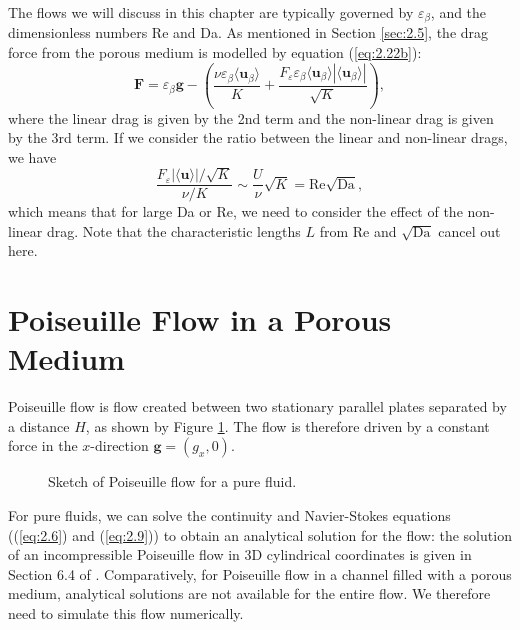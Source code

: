 \documentclass[a4paper, 11pt]{report}
\begin{document}
The flows we will discuss in this chapter are typically governed by $\varepsilon_\beta$, and the dimensionless numbers Re and Da. As mentioned in Section \ref{sec:2.5}, the drag force from the porous medium is modelled by equation (\ref{eq:2.22b}):
\begin{equation}
    \mathbf{F} = \varepsilon_\beta\mathbf{g} - \left(\frac{\nu\varepsilon_\beta\langle\mathbf{u}_\beta\rangle}{K} + \frac{F_\varepsilon\varepsilon_\beta\langle\mathbf{u}_\beta\rangle\left|\langle\mathbf{u}_\beta\rangle\right|}{\sqrt{K}}\right), \label{eq:4.3}
\end{equation}
where the linear drag is given by the 2nd term and the non-linear drag is given by the 3rd term. If we consider the ratio between the linear and non-linear drags, we have
\begin{equation}
    \frac{F_\varepsilon|\langle\mathbf{u}\rangle|/\sqrt{K}}{\nu/K} \sim \frac{U}{\nu}\sqrt{K}=\mathrm{Re}\sqrt{\mathrm{Da}}, \label{eq:4.4}
\end{equation}
which means that for large Da or Re, we need to consider the effect of the non-linear drag. Note that the characteristic lengths $L$ from Re and $\sqrt{\mathrm{Da}}$ cancel out here.

\section{Poiseuille Flow in a Porous Medium}
Poiseuille flow is flow created between two stationary parallel plates separated by a distance $H$, as shown by Figure \ref{fig:poiseuille}. The flow is therefore driven by a constant force in the $x$-direction $\mathbf{g} = (g_x, 0)$.
\begin{figure}[!htb]
\centering

\caption{Sketch of Poiseuille flow for a pure fluid.}
\label{fig:poiseuille}
\end{figure}

For pure fluids, we can solve the continuity and Navier-Stokes equations ((\ref{eq:2.6}) and (\ref{eq:2.9})) to obtain an analytical solution for the flow: the solution of an incompressible Poiseuille flow in 3D cylindrical coordinates is given in Section 6.4 of \cite{fmnotes}. Comparatively, for Poiseuille flow in a channel filled with a porous medium, analytical solutions are not available for the entire flow. We therefore need to simulate this flow numerically. 
\end{document}
